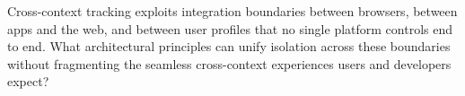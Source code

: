 \begin{opbox}
Cross-context tracking exploits integration boundaries between browsers, between apps and the web, and between user profiles that no single platform controls end to end. What architectural principles can unify isolation across these boundaries without fragmenting the seamless cross-context experiences users and developers expect?
\end{opbox}



